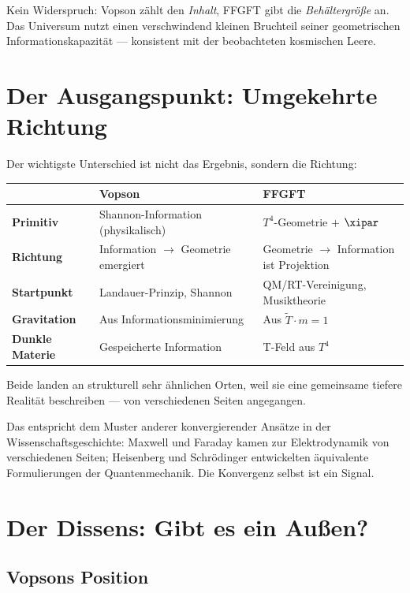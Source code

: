 Kein Widerspruch: Vopson zählt den \emph{Inhalt}, FFGFT gibt die
\emph{Behältergröße} an. Das Universum nutzt einen verschwindend kleinen
Bruchteil seiner geometrischen Informationskapazität --- konsistent mit
der beobachteten kosmischen Leere.

\section{Der Ausgangspunkt: Umgekehrte Richtung}

Der wichtigste Unterschied ist nicht das Ergebnis, sondern die Richtung:

\begin{longtable}{>{\bfseries}p{3cm} p{5cm} p{5cm}}
\toprule
 & Vopson & FFGFT \\
\midrule
Primitiv & Shannon-Information (physikalisch) & $T^4$-Geometrie + $\xipar$ \\
Richtung & Information $\rightarrow$ Geometrie emergiert & Geometrie $\rightarrow$ Information ist Projektion \\
Startpunkt & Landauer-Prinzip, Shannon & QM/RT-Vereinigung, Musiktheorie \\
Gravitation & Aus Informationsminimierung & Aus $\tilde{T} \cdot m = 1$ \\
Dunkle Materie & Gespeicherte Information & T-Feld aus $T^4$ \\
\bottomrule
\end{longtable}

Beide landen an strukturell sehr ähnlichen Orten, weil sie eine gemeinsame
tiefere Realität beschreiben --- von verschiedenen Seiten angegangen.

Das entspricht dem Muster anderer konvergierender Ansätze in der
Wissenschaftsgeschichte: Maxwell und Faraday kamen zur Elektrodynamik von
verschiedenen Seiten; Heisenberg und Schrödinger entwickelten äquivalente
Formulierungen der Quantenmechanik. Die Konvergenz selbst ist ein Signal.

\section{Der Dissens: Gibt es ein Außen?}

\subsection{Vopsons Position}


